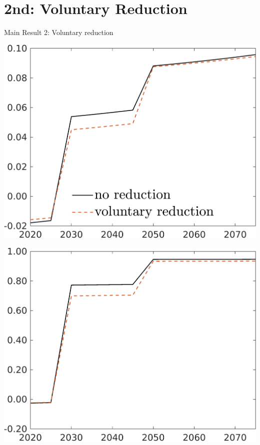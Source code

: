 \documentclass[11pt,aspectratio=169]{beamer}
\begin{document}
	\section*{2nd: Voluntary Reduction}
\begin{frame}{Main Result 2: Voluntary reduction}
	\centering
	\begin{minipage}[]{0.32\textwidth}
		\includegraphics[width=1\textwidth]{../codding_model/own_basedOnFried/optimalPol_elastS_DisuSci/figures/all_1705/Single_OPT_T_NoTaus_taul_spillover0_sep1_BN1_ineq0_redCOMP_etaa0.79_lgd1.png}
	\end{minipage}
\begin{minipage}[]{0.32\textwidth}
	\includegraphics[width=1\textwidth]{../codding_model/own_basedOnFried/optimalPol_elastS_DisuSci/figures/all_1705/Single_OPT_T_NoTaus_tauf_spillover0_sep1_BN1_ineq0_redCOMP_etaa0.79_lgd0.png}

\end{minipage}
\end{frame}
\end{document}
